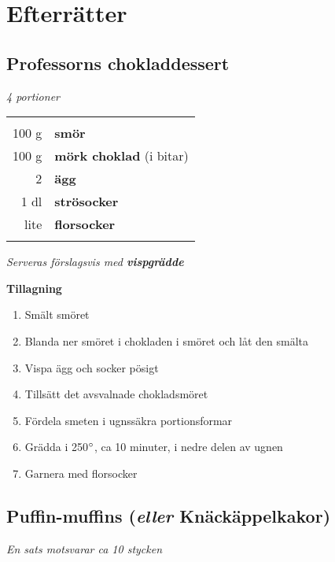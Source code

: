\documentclass[a4paper,12pt]{article}
\newcommand{\altnamn}[1]{\noindent \small{(\textit{eller} #1)}}
\newcommand{\port}[1]{\noindent \textit{#1 portioner}}
\newcommand{\tillb}[1]{\noindent \textit{Serveras förslagsvis med \textbf{#1}} \vspace{1cm}}
\newcommand{\sats}[1]{\noindent \textit{En sats motsvarar #1}}
\begin{document}

\section{Efterrätter}

\clearpage

\subsection{Professorns chokladdessert}
\port{4}

\begin{table}[H]
	\begin{tabular}{rl}
	\hline
	&\\
		100 g & \textbf{smör}\\
		100 g & \textbf{mörk choklad} (i bitar)\\
		2 & \textbf{ägg}\\
		1 dl & \textbf{strösocker}\\
		lite & \textbf{florsocker}\\
	&\\
	\hline
	\end{tabular}
\end{table}

\tillb{vispgrädde}

\begin{multicols*}{2}

\noindent \textbf{Tillagning}
\begin{enumerate}
	\itemsep0cm
	\item Smält smöret
	\item Blanda ner smöret i chokladen i smöret och låt den smälta
	\item Vispa ägg och socker pösigt
	\item Tillsätt det avsvalnade chokladsmöret
	\item Fördela smeten i ugnssäkra portions\-formar
	\item Grädda i 250$\degree$, ca 10 minuter, i nedre delen av ugnen
	\item Garnera med florsocker
\end{enumerate}

\end{multicols*}

\clearpage

\subsection{Puffin-muffins \altnamn{Knäckäppelkakor}}
\sats{ca 10 stycken}
\end{document}
